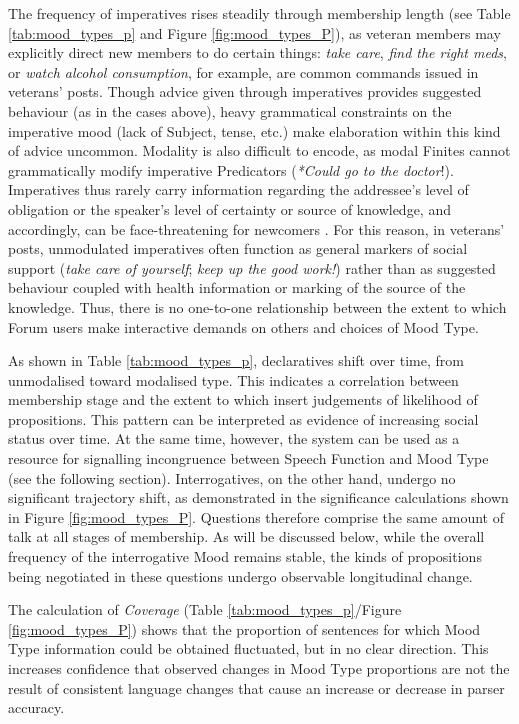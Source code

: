 The frequency of imperatives rises steadily through membership length (see Table \ref{tab:mood_types_p} and Figure \ref{fig:mood_types_P}), as veteran \glspl{member} may explicitly direct new \glspl{member} to do certain things: \emph{take care}, \emph{find the right meds}, or \emph{watch alcohol consumption}, for example, are common commands issued in veterans' \glspl{post}. Though advice given through imperatives provides suggested behaviour (as in the cases above), heavy grammatical constraints on the imperative mood (lack of Subject, tense, etc.) make elaboration within this kind of advice uncommon. Modality is also difficult to encode, as modal Finites cannot grammatically modify imperative Predicators (\emph{*Could go to the doctor}!). Imperatives thus rarely carry information regarding the addressee's level of obligation or the speaker's level of certainty or source of knowledge, and accordingly, can be face\hyp{}threatening for newcomers \cite{goldsmith2004communicating,hudson1990discourse}. For this reason, in veterans' \glspl{post}, unmodulated imperatives often function as general markers of social support (\emph{take care of yourself}; \emph{keep up the good work!}) rather than as suggested behaviour coupled with health information or marking of the source of the knowledge. Thus, there is no one-to-one relationship between the extent to which \gls{Forum} users make interactive demands on others and choices of Mood Type.

As shown in Table \ref{tab:mood_types_p}, declaratives shift over time, from unmodalised toward modalised type. This indicates a correlation between membership stage and the extent to which  insert judgements of likelihood of propositions. This pattern can be interpreted as evidence of increasing social status over time. At the same time, however, the  system can be used as a resource for signalling incongruence between Speech Function and Mood Type (see the following section). Interrogatives, on the other hand, undergo no significant trajectory shift, as demonstrated in the significance calculations shown in Figure \ref{fig:mood_types_P}. Questions therefore comprise the same amount of talk at all stages of membership. As will be discussed below, while the overall frequency of the interrogative Mood remains stable, the kinds of propositions being negotiated in these questions undergo observable longitudinal change.

The calculation of \emph{Coverage} (Table \ref{tab:mood_types_p}\slash Figure \ref{fig:mood_types_P}) shows that the proportion of sentences for which Mood Type information could be obtained fluctuated, but in no clear direction. This increases confidence that observed changes in Mood Type proportions are not the result of consistent language changes that cause an increase or decrease in parser accuracy.


